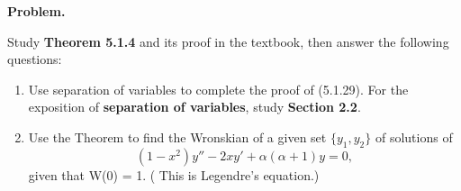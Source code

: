 \documentclass[12pt]{article}
\title{}
\date{}
\begin{document}
\noindent
{\bf Problem.}

Study {\bf Theorem 5.1.4} and its proof in the textbook, then answer the following questions:
\begin{enumerate}
\item Use separation of variables to complete the proof of (5.1.29). For the exposition of {\bf separation of variables}, study {\bf Section 2.2}.
\item Use the Theorem to find the Wronskian of a given set $\{y_1,y_2\}$ of solutions of
\[
	(1-x^2)y'' - 2xy' + \alpha(\alpha + 1)y = 0,
\]
given that W(0) = 1. ( This is Legendre's equation.)
\end{enumerate}
\end{document}
